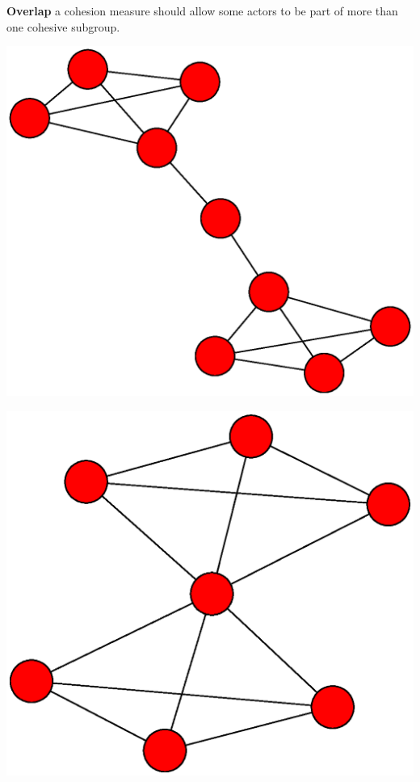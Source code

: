 \documentclass[ignorenonframetext,red,8pt,notes=hide]{beamer}
\begin{document}
\begin{frame}[label=]
\begin{columns}[c]
\pause

\begin{column}{0.3\textwidth}
\textbf{Overlap} a cohesion measure should allow some actors to be part of more than one cohesive subgroup.

\begin{center}
\includegraphics[scale=0.1]{img/hole}
\end{center}

\begin{center}
\includegraphics[scale=0.1]{img/fold}
\end{center}
\end{column}


\end{columns}
\end{frame}
\end{document}
